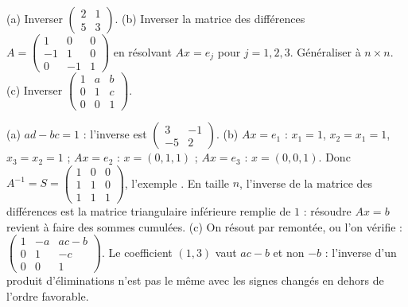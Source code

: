 \begin{exo}
(a) Inverser $\begin{pmatrix}2&1\\5&3\end{pmatrix}$.
(b) Inverser la matrice des différences $A=\begin{pmatrix}1&0&0\\-1&1&0\\0&-1&1\end{pmatrix}$ en résolvant $Ax=e_j$ pour $j=1,2,3$. Généraliser à $n\times n$.
(c) Inverser $\begin{pmatrix}1&a&b\\0&1&c\\0&0&1\end{pmatrix}$.
\begin{corrige}
(a) $ad-bc=1$ : l'inverse est $\begin{pmatrix}3&-1\\-5&2\end{pmatrix}$.
(b) $Ax=e_1$ : $x_1=1$, $x_2=x_1=1$, $x_3=x_2=1$ ; $Ax=e_2$ : $x=(0,1,1)$ ; $Ax=e_3$ : $x=(0,0,1)$. Donc $A^{-1}=S=\begin{pmatrix}1&0&0\\1&1&0\\1&1&1\end{pmatrix}$, l'exemple . En taille $n$, l'inverse de la matrice des différences est la matrice triangulaire inférieure remplie de $1$ : résoudre $Ax=b$ revient à faire des sommes cumulées.
(c) On résout par remontée, ou l'on vérifie : $\begin{pmatrix}1&-a&ac-b\\0&1&-c\\0&0&1\end{pmatrix}$. Le coefficient $(1,3)$ vaut $ac-b$ et non $-b$ : l'inverse d'un produit d'éliminations n'est pas \og le même avec les signes changés \fg{} en dehors de l'ordre favorable.
\end{corrige}
\end{exo}
